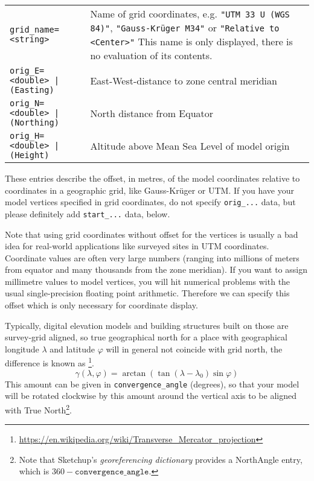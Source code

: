 \begin{longtable}{lp{84mm}} 
\texttt{grid\_name=<string> }& Name of grid coordinates, e.g. \texttt{"UTM 33 U (WGS 84)"},
                               \texttt{"Gauss-Kr\"uger M34"} or \texttt{"Relative to <Center>"} This name is
                              only displayed, there is no evaluation of its contents.\\
\texttt{orig\_E=<double> | (Easting)}  &East-West-distance to zone central meridian\\
\texttt{orig\_N=<double> | (Northing)} &North distance from Equator\\
\texttt{orig\_H=<double> | (Height)}   &Altitude above Mean Sea Level of model origin\\
\end{longtable}

\noindent These entries describe the offset, in metres, of the model coordinates relative
to coordinates in a geographic grid, like Gauss-Kr\"uger or UTM. If you have your model
vertices specified in grid coordinates, do not specify \verb|orig_...| data, but
please definitely add \verb|start_...| data, below.

Note that using grid coordinates without offset for the vertices is
usually a bad idea for real-world applications like surveyed sites in
UTM coordinates. Coordinate values are often very large numbers
(ranging into millions of meters from equator and many thousands from
the zone meridian). If you want to assign millimetre values to model
vertices, you will hit numerical problems with the usual
single-precision floating point arithmetic. Therefore we can specify
this offset which is only necessary for coordinate display.

Typically, digital elevation models and building structures built on
those are survey-grid aligned, so true geographical north for a place
with geographical longitude $\lambda$ and latitude $\varphi$ will in
general not coincide with grid north, the difference is known as
\footnote{%
  \url{https://en.wikipedia.org/wiki/Transverse_Mercator_projection}}.
\begin{equation}
\gamma(\lambda, \varphi)=\arctan(\tan(\lambda-\lambda_0)\sin\varphi)
\end{equation}
This amount can be given in \verb|convergence_angle| (degrees), so
that your model will be rotated clockwise by this amount around the
vertical axis to be aligned with True North\footnote{Note that
  Sketchup's \emph{georeferencing dictionary} provides a NorthAngle
  entry, which is $360-\mathtt{convergence\_angle}$.}.


